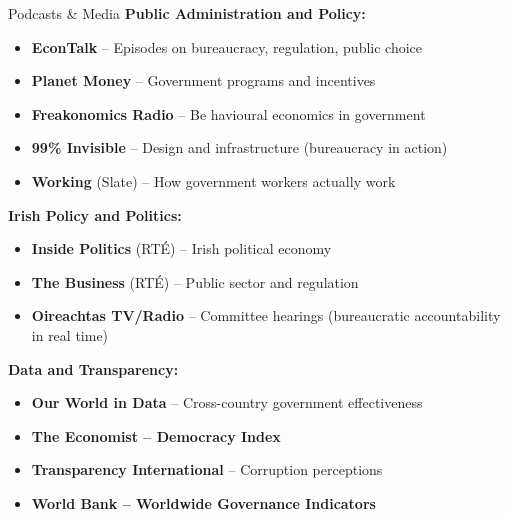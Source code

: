\documentclass[10pt]{beamer}
\begin{document}
\begin{frame}[allowframebreaks]{Podcasts \& Media}
\textbf{Public Administration and Policy:}
\begin{itemize}
\item \textbf{EconTalk} – Episodes on bureaucracy, regulation, public choice
\item \textbf{Planet Money} – Government programs and incentives
\item \textbf{Freakonomics Radio} – Be havioural economics in government
\item \textbf{99\% Invisible} – Design and infrastructure (bureaucracy in action)
\item \textbf{Working} (Slate) – How government workers actually work
\end{itemize}

\framebreak
\textbf{Irish Policy and Politics:}
\begin{itemize}
\item \textbf{Inside Politics} (RTÉ) – Irish political economy
\item \textbf{The Business} (RTÉ) – Public sector and regulation
\item \textbf{Oireachtas TV/Radio} – Committee hearings (bureaucratic accountability in real time)
\end{itemize}

\framebreak
\textbf{Data and Transparency:}
\begin{itemize}
\item \textbf{Our World in Data} – Cross-country government effectiveness
\item \textbf{The Economist – Democracy Index}
\item \textbf{Transparency International} – Corruption perceptions
\item \textbf{World Bank – Worldwide Governance Indicators}
\end{itemize}
\end{frame}
\end{document}
